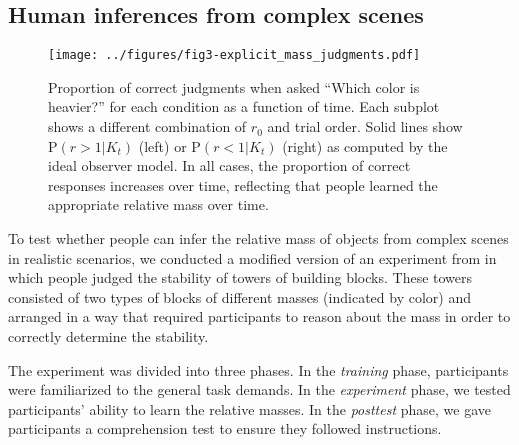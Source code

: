 \documentclass[10pt,letterpaper]{article}
\renewcommand{\Pr}[0]{\mathrm{P}}
\newcommand{\rlow}[0]{$r_0=0.1$}
\newcommand{\rhigh}[0]{$r_0=10$}
\newcommand{\vfb}[0]{video feedback}
\newcommand{\fb}[0]{binary text feedback}
\begin{document}
\subsection{Human inferences from complex scenes}

\begin{figure*}[t]
  \begin{center}
    \texttt{[image: ../figures/fig3-explicit\_mass\_judgments.pdf]}
    \caption{\small Proportion of correct judgments when asked ``Which
      color is heavier?'' for each condition as a function of
      time. Each subplot shows a different combination of $r_0$ and
      trial order. Solid lines show $\Pr(r>1|K_t)$ (left) or
      $\Pr(r<1|K_t)$ (right) as computed by the ideal observer
      model. In all cases, the proportion of correct responses
      increases over time, reflecting that people learned the
      appropriate relative mass over time.  }
    \label{fig:explicit-mass-judgments}
  \end{center}
\end{figure*}

To test whether people can infer the relative mass of objects from
complex scenes in realistic scenarios, we conducted a modified version
of an experiment from  in which people judged the
stability of towers of building blocks. These towers consisted of two
types of blocks of different masses (indicated by color) and arranged
in a way that required participants to reason about the mass in order
to correctly determine the stability.

The experiment was divided into three phases. In the \textit{training}
phase, participants were familiarized to the general task demands. In
the \textit{experiment} phase, we tested participants' ability to
learn the relative masses. In the \textit{posttest} phase, we gave
participants a comprehension test to ensure they followed
instructions.

\end{document}
